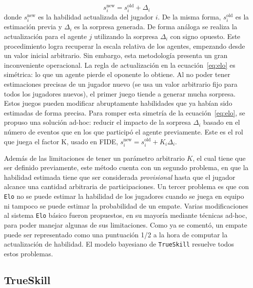\documentclass[11pt,twoside,spanish]{report} %
\begin{document}
\begin{equation}\label{eq:elo}
s_i^{\text{new}} = s_i^{\text{old}} + \Delta_i
\end{equation}
donde $s_i^{\text{new}}$ es la habilidad actualizada del jugador $i$.
De la misma forma, $s_i^{\text{old}}$ es la estimaci\'on previa y $\Delta_i$ es la sorpresa generada.
De forma an\'aloga se realiza la actualizaci\'on para el agente $j$ utilizando la sorpresa $\Delta_i$ con signo opuesto.
Este procedimiento logra recuperar la escala relativa de los agentes, empezando desde un valor inicial arbitrario.
Sin embargo, esta metodolog\'ia presenta un gran inconveniente operacional.
La regla de actualizaci\'on en la ecuaci\'on~\ref{eq:elo} es sim\'etrica: lo que un agente pierde el oponente lo obtiene.
Al no poder tener estimaciones precisas de un jugador nuevo (se usa un valor arbitrario fijo para todos los jugadores nuevos), el primer juego tiende a generar mucha sorpresa.
Estos juegos pueden modificar abruptamente habilidades que ya hab\'ian sido estimadas de forma precisa.
Para romper esta simetr\'ia de la ecuaci\'on~\ref{eq:elo}, se propuso una soluci\'on ad-hoc: reducir el impacto de la sorpresa $\Delta_i$ basado en el n\'umero de eventos que en los que particip\'o el agente previamente.
Este es el rol que juega el factor K, usado en FIDE, $s_i^{\text{new}} = s_i^{\text{old}} + K_i\Delta_i$.

Adem\'as de las limitaciones de tener un par\'ametro arbitrario $K$, el cual tiene que ser definido previamente, este m\'etodo cuenta con un segundo problema, en que la habilidad estimada tiene que ser considerada \emph{provisional} hasta que el jugador alcance una cantidad arbitraria de participaciones.
Un tercer problema es que con \texttt{Elo} no se puede estimar la habilidad de los jugadores cuando se juega en equipo ni tampoco se puede estimar la probabilidad de un empate.
Varias modificaciones al sistema \texttt{Elo} b\'asico fueron propuestos, en su mayor\'ia mediante t\'ecnicas ad-hoc, para poder manejar algunas de sus limitaciones.
Como ya se coment\'o, un empate puede ser representado como una puntuaci\'on 1/2 a la hora de computar la actualizaci\'on de habilidad.
El modelo bayesiano de \texttt{TrueSkill} resuelve todos estos problemas.


\subsection{TrueSkill}
\end{document}
